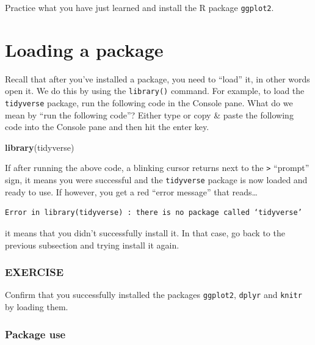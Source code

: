 \documentclass[]{book}
\newenvironment{Shaded}{\begin{snugshade}}{\end{snugshade}}
\newcommand{\KeywordTok}[1]{\textcolor[rgb]{0.13,0.29,0.53}{\textbf{#1}}}
\newcommand{\NormalTok}[1]{#1}
\begin{document}
Practice what you have just learned and install the R package \texttt{ggplot2}.

\hypertarget{loading-a-package}{%
\section{Loading a package}\label{loading-a-package}}

Recall that after you've installed a package, you need to ``load'' it, in other words open it. We do this by using the \texttt{library()} command. For example, to load the \texttt{tidyverse} package, run the following code in the Console pane. What do we mean by ``run the following code''? Either type or copy \& paste the following code into the Console pane and then hit the enter key.

\begin{Shaded}
\begin{Highlighting}[]
\KeywordTok{library}\NormalTok{(tidyverse)}
\end{Highlighting}
\end{Shaded}

If after running the above code, a blinking cursor returns next to the \texttt{\textgreater{}} ``prompt'' sign, it means you were successful and the \texttt{tidyverse} package is now loaded and ready to use. If however, you get a red ``error message'' that reads\ldots{}

\begin{verbatim}
Error in library(tidyverse) : there is no package called ‘tidyverse’
\end{verbatim}

it means that you didn't successfully install it. In that case, go back to the previous subsection and trying install it again.

\hypertarget{exercise-3}{%
\subsubsection*{EXERCISE}\label{exercise-3}}

Confirm that you successfully installed the packages \texttt{ggplot2}, \texttt{dplyr} and \texttt{knitr} by loading them.

\hypertarget{package-use}{%
\subsubsection*{Package use}\label{package-use}}
\end{document}
